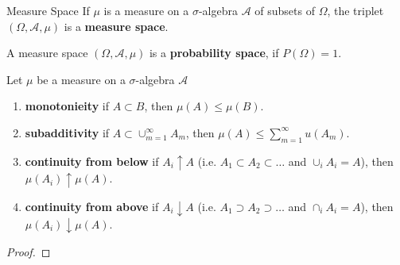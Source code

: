 \begin{definition}{Measure Space}{}
    If $\mu$ is a measure on a $\sigma$-algebra $\mathcal{A}$ of subsets of $\Omega$, the triplet $(\Omega,\mathcal{A},\mu)$ is a \textbf{measure space}.
\end{definition}

\begin{note}
    A measure space $(\Omega,\mathcal{A},\mu)$ is a \textbf{probability space}, if $P(\Omega)=1$.
\end{note}

\begin{property}
    Let $\mu$ be a measure on a $\sigma$-algebra $\mathcal{A}$
    \begin{enumerate}
        \item \textbf{monotonieity} if $A\subset B$, then $\mu(A)\leq\mu(B)$.
        \item \textbf{subadditivity} if $A\subset\cup_{m=1}^{\infty} A_m$, then $\mu(A)\leq\sum_{m=1}^{\infty}  u(A_m)$.
        \item \textbf{continuity from below} if $A_i\uparrow A$ (i.e. $A_1\subset A_2\subset \ldots$ and $\cup_iA_i=A$), then $\mu(A_i)\uparrow \mu(A)$.
        \item \textbf{continuity from above} if $A_i\downarrow A$ (i.e. $A_1\supset A_2\supset \ldots$ and $\cap_iA_i=A$), then $\mu(A_i)\downarrow \mu(A)$.
    \end{enumerate}
\end{property}

\begin{proof}
    
\end{proof}
